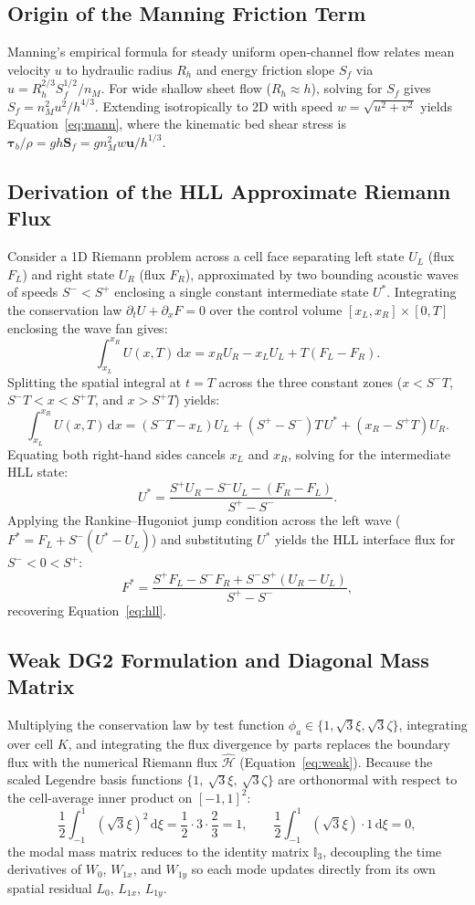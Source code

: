 \documentclass[11pt,a4paper]{article}
\newcommand{\dd}{\mathrm d}
\begin{document}
\subsection{Origin of the Manning Friction Term}

Manning's empirical formula for steady uniform open-channel flow relates mean velocity $u$ to hydraulic radius $R_h$ and energy friction slope $S_f$ via $u=R_h^{2/3}S_f^{1/2}/n_M$. For wide shallow sheet flow ($R_h\approx h$), solving for $S_f$ gives $S_f=n_M^2u^2/h^{4/3}$. Extending isotropically to 2D with speed $w=\sqrt{u^2+v^2}$ yields Equation~\eqref{eq:mann}, where the kinematic bed shear stress is $\boldsymbol\tau_b/\rho = gh\mathbf S_f = gn_M^2w\mathbf u/h^{1/3}$.

\subsection{Derivation of the HLL Approximate Riemann Flux}

Consider a 1D Riemann problem across a cell face separating left state $U_L$ (flux $F_L$) and right state $U_R$ (flux $F_R$), approximated by two bounding acoustic waves of speeds $S^-<S^+$ enclosing a single constant intermediate state $U^*$. Integrating the conservation law $\partial_tU+\partial_xF=0$ over the control volume $[x_L,x_R]\times[0,T]$ enclosing the wave fan gives:
\[
  \int_{x_L}^{x_R}U(x,T)\,\dd x=x_RU_R-x_LU_L+T(F_L-F_R).
\]
Splitting the spatial integral at $t=T$ across the three constant zones ($x<S^-T$, $S^-T<x<S^+T$, and $x>S^+T$) yields:
\[
  \int_{x_L}^{x_R}U(x,T)\,\dd x=(S^-T-x_L)U_L+(S^+-S^-)T\,U^*+(x_R-S^+T)U_R .
\]
Equating both right-hand sides cancels $x_L$ and $x_R$, solving for the intermediate HLL state:
\begin{equation}
  U^*=\frac{S^+U_R-S^-U_L-(F_R-F_L)}{S^+-S^-}.
\end{equation}
Applying the Rankine--Hugoniot jump condition across the left wave ($F^*=F_L+S^-(U^*-U_L)$) and substituting $U^*$ yields the HLL interface flux for $S^-<0<S^+$:
\[
  F^*=\frac{S^+F_L-S^-F_R+S^-S^+(U_R-U_L)}{S^+-S^-},
\]
recovering Equation~\eqref{eq:hll}.

\subsection{Weak DG2 Formulation and Diagonal Mass Matrix}

Multiplying the conservation law by test function $\phi_a \in \{1,\sqrt3\xi,\sqrt3\zeta\}$, integrating over cell $K$, and integrating the flux divergence by parts replaces the boundary flux with the numerical Riemann flux $\widehat{\mathcal H}$ (Equation~\eqref{eq:weak}). Because the scaled Legendre basis functions $\{1,\ \sqrt3\xi,\ \sqrt3\zeta\}$ are orthonormal with respect to the cell-average inner product on $[-1,1]^2$:
\[
  \frac12\int_{-1}^{1}(\sqrt3\xi)^2\,\dd\xi=\frac12\cdot3\cdot\frac23=1,
  \qquad
  \frac12\int_{-1}^{1}(\sqrt3\xi)\cdot1\,\dd\xi=0 ,
\]
the modal mass matrix reduces to the identity matrix $\mathbb{I}_3$, decoupling the time derivatives of $W_0$, $W_{1x}$, and $W_{1y}$ so each mode updates directly from its own spatial residual $L_0$, $L_{1x}$, $L_{1y}$.
\end{document}
